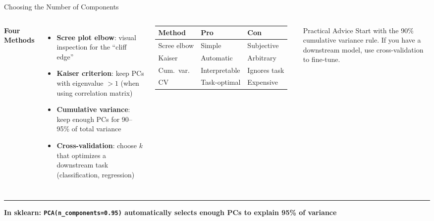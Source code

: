 \documentclass[8pt,aspectratio=169]{beamer}
\newcommand{\bottomnote}[1]{%
\vfill
\vspace{-2mm}
\textcolor{mllavender2}{\rule{\textwidth}{0.4pt}}
\vspace{1mm}
\footnotesize
\textbf{#1}
}
\newenvironment{compactlist}{%
  \begin{itemize}%
    \setlength{\itemsep}{2pt}%
    \setlength{\parskip}{0pt}%
    \setlength{\parsep}{0pt}%
}{%
  \end{itemize}%
}
\newcommand{\highlight}[1]{\textcolor{mlorange}{\textbf{#1}}}
\begin{document}
\begin{frame}[t]{Choosing the Number of Components}
\begin{columns}[T]
\small
\textbf{Four Methods}
\begin{compactlist}
\item \highlight{Scree plot elbow}: visual inspection for the ``cliff edge''
\item \highlight{Kaiser criterion}: keep PCs with eigenvalue $> 1$ (when using correlation matrix)
\item \highlight{Cumulative variance}: keep enough PCs for 90--95\% of total variance
\item \highlight{Cross-validation}: choose $k$ that optimizes a downstream task (classification, regression)
\end{compactlist}

\vspace{2mm}
\footnotesize
\begin{tabular}{@{}l l l@{}}
\toprule
\textbf{Method} & \textbf{Pro} & \textbf{Con} \\
\midrule
\rowcolor{mllavender4}
Scree elbow & Simple & Subjective \\
Kaiser & Automatic & Arbitrary \\
\rowcolor{mllavender4}
Cum.\ var.\ & Interpretable & Ignores task \\
CV & Task-optimal & Expensive \\
\bottomrule
\end{tabular}

\vspace{3mm}
\begin{block}{Practical Advice}
\scriptsize Start with the 90\% cumulative variance rule. If you have a downstream model, use cross-validation to fine-tune.
\end{block}
\end{columns}

\bottomnote{In sklearn: \texttt{PCA(n\_components=0.95)} automatically selects enough PCs to explain 95\% of variance}
\end{frame}
\end{document}
